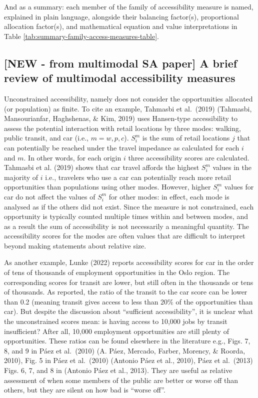 \documentclass[
11pt, %
oneside, %
english, %
singlespacing, %
]{macthesis} %
\begin{document}
And as a summary: each member of the family of accessibility measure is named, explained in plain language, alongside their balancing factor(s), proportional allocation factor(s), and mathematical equation and value interpretations in Table \ref{tab:summary-family-access-measures-table}.



\subsection{{[}NEW - from multimodal SA paper{]} A brief review of multimodal accessibility measures}\label{new---from-multimodal-sa-paper-a-brief-review-of-multimodal-accessibility-measures}

Unconstrained accessibility, namely does not consider the opportunities allocated (or population) as finite. To cite an example, Tahmasbi et al.~(2019) (Tahmasbi, Mansourianfar, Haghshenas, \& Kim, 2019) uses Hansen-type accessibility to assess the potential interaction with retail locations by three modes: walking, public transit, and car (i.e., \(m = w, p, c\)). \(S_i^m\) is the sum of retail locations \(j\) that can potentially be reached under the travel impedance as calculated for each \(i\) and \(m\). In other words, for each origin \(i\) three accessibility scores are calculated. Tahmasbi et al. (2019) shows that car travel affords the highest \(S_i^{m}\) values in the majority of \(i\) i.e., travelers who use a car can potentially reach more retail opportunities than populations using other modes. However, higher \(S_i^{m}\) values for car do not affect the values of \(S_i^{m}\) for other modes: in effect, each mode is analysed as if the others did not exist. Since the measure is not constrained, each opportunity is typically counted multiple times within and between modes, and as a result the sum of accessibility is not necessarily a meaningful quantity. The accessibility scores for the modes are often values that are difficult to interpret beyond making statements about relative size.

As another example, Lunke (2022) reports accessibility scores for car in the order of tens of thousands of employment opportunities in the Oslo region. The corresponding scores for transit are lower, but still often in the thousands or tens of thousands. As reported, the ratio of the transit to the car score can be lower than 0.2 (meaning transit gives access to less than 20\% of the opportunities than car). But despite the discussion about ``sufficient accessibility'', it is unclear what the unconstrained scores mean: is having access to 10,000 jobs by transit insufficient? After all, 10,000 employment opportunities are still plenty of opportunities. These ratios can be found elsewhere in the literature e.g., Figs. 7, 8, and 9 in Páez et al.~(2010) (A. Páez, Mercado, Farber, Morency, \& Roorda, 2010), Fig. 5 in Páez et al.~(2010) (Antonio Páez et al., 2010), Páez et al.~(2013) Figs. 6, 7, and 8 in (Antonio Páez et al., 2013). They are useful as relative assessment of when some members of the public are better or worse off than others, but they are silent on how bad is ``worse off''.
\end{document}
